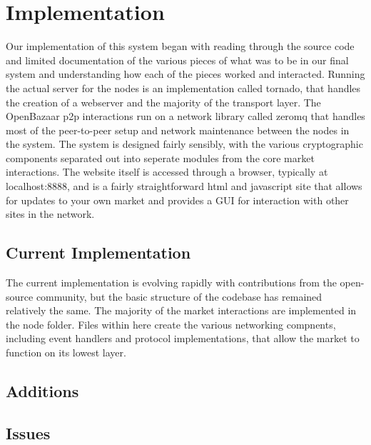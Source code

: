 \documentclass[12pt,twocolumn]{article}
\begin{document}
\section{Implementation}
Our implementation of this system began with reading through the source code and limited documentation of the various pieces of what was to be in our final system and understanding how each of the pieces worked and interacted. Running the actual server for the nodes is an implementation called tornado, that handles the creation of a webserver and the majority of the transport layer. The OpenBazaar p2p interactions run on a network library called zeromq that handles most of the peer-to-peer setup and network maintenance between the nodes in the system. The system is designed fairly sensibly, with the various cryptographic components separated out into seperate modules from the core market interactions. The website itself is accessed through a browser, typically at {{\sc localhost:8888}}, and is a fairly straightforward html and javascript site that allows for updates to your own market and provides a GUI for interaction with other sites in the network.

\subsection{Current Implementation}
The current implementation is evolving rapidly with contributions from the open-source community, but the basic structure of the codebase has remained relatively the same. The majority of the market interactions are implemented in the node folder. Files within here create the various networking compnents, including event handlers and protocol implementations, that allow the market to function on its lowest layer. 

\subsection{Additions}

\newcommand{\Twisted}{}
\def\Twisted/{{\sc Twisted}}
\newcommand{\Tornado}{}
\def\Tornado/{{\sc Tornado}}
\newcommand{\Entangled}{}
\def\Entangled/{{\sc Entangled}}

\subsection{Issues}
\end{document}
